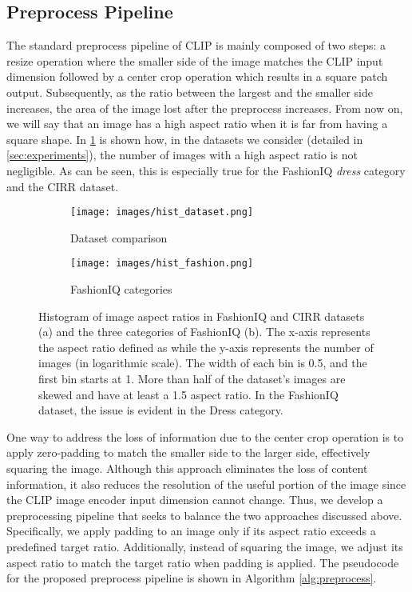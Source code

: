 \documentclass[acmlarge]{acmart}
\begin{document}
\subsection{Preprocess Pipeline}\label{sec:preprocess}
The standard preprocess pipeline of CLIP is mainly composed of two steps: a resize operation where the smaller side of the image matches the CLIP input dimension  followed by a center crop operation which results in a square patch   output.
Subsequently, as the ratio between the largest and the smaller side increases, the area of the image lost after the preprocess increases. From now on, we will say that an image has a high aspect ratio when it is far from having a square shape.
In \cref{fig:hist_plot} is shown how, in the datasets we consider (detailed in \cref{sec:experiments}), the number of images with a high aspect ratio is not negligible. As can be seen, this is especially true for the FashionIQ \emph{dress} category and the CIRR dataset.


\begin{figure}[tb]
       \centering
    \begin{subfigure}{0.45\linewidth}
    \texttt{[image: images/hist\_dataset.png]}
    \caption{Dataset comparison}
    \end{subfigure}\hfill
 \begin{subfigure}{0.45\linewidth}
    \texttt{[image: images/hist\_fashion.png]}
    \caption{FashionIQ categories}
    \end{subfigure}
     \vspace{-1.8ex}
    \caption{Histogram of image aspect ratios in FashionIQ and CIRR datasets (a) and the three categories of FashionIQ (b). The x-axis represents the aspect ratio defined as  while the y-axis represents the number of images (in logarithmic scale). The width of each bin is 0.5, and the first bin starts at 1. More than half of the dataset's images are skewed and have at least a 1.5 aspect ratio. In the FashionIQ dataset, the issue is evident in the Dress category.}
    \label{fig:hist_plot}
    \vspace{-3ex}
\end{figure}

One way to address the loss of information due to the center crop operation is to apply zero-padding to match the smaller side to the larger side, effectively squaring the image. 
Although this approach eliminates the loss of content information, it also reduces the resolution of the useful portion of the image since the CLIP image encoder input dimension cannot change.
Thus, we develop a preprocessing pipeline that seeks to balance the two approaches discussed above. Specifically, we apply padding to an image only if its aspect ratio exceeds a predefined target ratio. Additionally, instead of squaring the image, we adjust its aspect ratio to match the target ratio when padding is applied.
The pseudocode for the proposed preprocess pipeline is shown in Algorithm \ref{alg:preprocess}.
\end{document}
